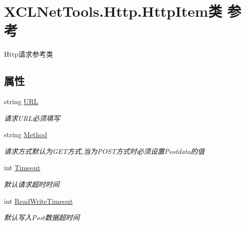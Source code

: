 \hypertarget{class_x_c_l_net_tools_1_1_http_1_1_http_item}{\section{X\-C\-L\-Net\-Tools.\-Http.\-Http\-Item类 参考}
\label{class_x_c_l_net_tools_1_1_http_1_1_http_item}
}


Http请求参考类  


\subsection*{属性}
\begin{DoxyCompactItemize}
\item 
string \hyperlink{class_x_c_l_net_tools_1_1_http_1_1_http_item_a7936af55970113dd94765443dadd47f7}{U\-R\-L}
\begin{DoxyCompactList}\small\item\em 请求\-U\-R\-L必须填写 \end{DoxyCompactList}\item 
string \hyperlink{class_x_c_l_net_tools_1_1_http_1_1_http_item_ac5086662fb0248c50436d33a38e9552d}{Method}
\begin{DoxyCompactList}\small\item\em 请求方式默认为\-G\-E\-T方式,当为\-P\-O\-S\-T方式时必须设置\-Postdata的值 \end{DoxyCompactList}\item 
int \hyperlink{class_x_c_l_net_tools_1_1_http_1_1_http_item_a916fc3ebf5e0a663cd007e016cb9628a}{Timeout}
\begin{DoxyCompactList}\small\item\em 默认请求超时时间 \end{DoxyCompactList}\item 
int \hyperlink{class_x_c_l_net_tools_1_1_http_1_1_http_item_a5a3c4b7bd1d06a2965e29bae818e358b}{Read\-Write\-Timeout}
\begin{DoxyCompactList}\small\item\em 默认写入\-Post数据超时间 \end{DoxyCompactList}\item 

\end{DoxyCompactItemize}
